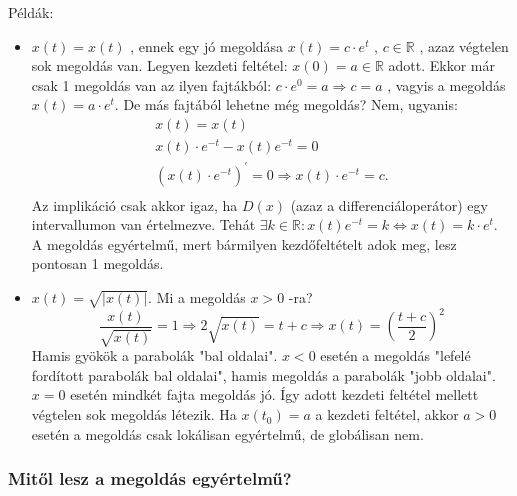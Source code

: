 \documentclass[12pt,a4paper]{scrartcl}
\providecommand{\tightlist}{%
  \setlength{\itemsep}{0pt}\setlength{\parskip}{0pt}}
\newenvironment{pelda}{}{}
\begin{document}
\begin{pelda}

Példák:

\begin{itemize}
\tightlist
\item
  \(\overset{}{x}\left( t \right) = x\left( t \right)\) , ennek egy jó
  megoldása \(x\left( t \right) = c \cdot e^{t}\) ,
  \(c \in {\mathbb{R}}\) , azaz végtelen sok megoldás van. Legyen
  kezdeti feltétel: \(x\left( 0 \right) = a \in {\mathbb{R}}\) adott.
  Ekkor már csak 1 megoldás van az ilyen fajtákból:
  \(\left. c \cdot e^{0} = a\Rightarrow c = a \right.\) , vagyis a
  megoldás \(x\left( t \right) = a \cdot e^{t}\). De más fajtából
  lehetne még megoldás? Nem, ugyanis: \[\begin{array}{l}
  {\overset{}{x}\left( t \right) = x\left( t \right)} \\
  {\overset{}{x}\left( t \right) \cdot e^{- t} - x\left( t \right)e^{- t} = 0} \\
  \left. \left( {x\left( t \right) \cdot e^{- t}} \right)^{\prime} = 0\Rightarrow x\left( t \right) \cdot e^{- t} = c. \right. \\
  \end{array}\] Az implikáció csak akkor igaz, ha \(D\left( x \right)\)
  (azaz a differenciáloperátor) egy intervallumon van értelmezve. Tehát
  \(\left. \exists k \in {\mathbb{R}}:x\left( t \right)e^{- t} = k\Leftrightarrow x\left( t \right) = k \cdot e^{t} \right.\).
  A megoldás egyértelmű, mert bármilyen kezdőfeltételt adok meg, lesz
  pontosan 1 megoldás.
\item
  \(\overset{}{x}\left( t \right) = \sqrt{\left| {x\left( t \right)} \right|}\).
  Mi a megoldás \(x > 0\) -ra?
  \[\left. \frac{\overset{}{x}\left( t \right)}{\sqrt{x\left( t \right)}} = 1\Rightarrow 2\sqrt{x\left( t \right)} = t + c\Rightarrow x\left( t \right) = \left( \frac{t + c}{2} \right)^{2} \right.\]
  Hamis gyökök a parabolák "bal oldalai". \(x < 0\) esetén a megoldás
  "lefelé fordított parabolák bal oldalai", hamis megoldás a parabolák
  "jobb oldalai". \(x = 0\) esetén mindkét fajta megoldás jó. Így adott
  kezdeti feltétel mellett végtelen sok megoldás létezik. Ha
  \(x\left( t_{0} \right) = a\) a kezdeti feltétel, akkor \(a > 0\)
  esetén a megoldás csak lokálisan egyértelmű, de globálisan nem.
\end{itemize}

\end{pelda}

\hypertarget{mitol-lesz-a-megoldas-egyertelmu}{%
\subsubsection{Mitől lesz a megoldás
egyértelmű?}\label{mitol-lesz-a-megoldas-egyertelmu}}
\end{document}
